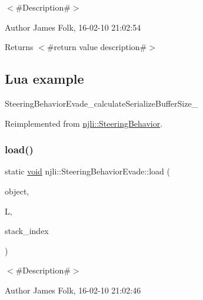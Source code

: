 $<$\#\+Description\#$>$ 

\begin{DoxyAuthor}{Author}
James Folk, 16-\/02-\/10 21\+:02\+:54
\end{DoxyAuthor}
\begin{DoxyReturn}{Returns}
$<$\#return value description\#$>$
\end{DoxyReturn}
\hypertarget{classnjli_1_1_steering_behavior_wander_ex1}{}\subsection{Lua example}\label{classnjli_1_1_steering_behavior_wander_ex1}

\begin{DoxyCodeInclude}
\end{DoxyCodeInclude}
Steering\+Behavior\+Evade\+\_\+calculate\+Serialize\+Buffer\+Size\+\_\+ 

Reimplemented from \mbox{\hyperlink{classnjli_1_1_steering_behavior_ae82bca8468d41aff8c22b76fd359fe9b}{njli\+::\+Steering\+Behavior}}.

\mbox{\label{classnjli_1_1_steering_behavior_evade_ac63d609bdeaf72751db55113f8928ffc}} 
\subsubsection{\texorpdfstring{load()}{load()}}
{\footnotesize\ttfamily static \mbox{\hyperlink{_thread_8h_af1e856da2e658414cb2456cb6f7ebc66}{void}} njli\+::\+Steering\+Behavior\+Evade\+::load (\begin{DoxyParamCaption}\item[{\mbox{\hyperlink{classnjli_1_1_steering_behavior_evade}{Steering\+Behavior\+Evade}} \&}]{object,  }\item[{lua\+\_\+\+State $\ast$}]{L,  }\item[{int}]{stack\+\_\+index }\end{DoxyParamCaption})\hspace{0.3cm}{\ttfamily [static]}}



$<$\#\+Description\#$>$ 

\begin{DoxyAuthor}{Author}
James Folk, 16-\/02-\/10 21\+:02\+:46
\end{DoxyAuthor}

